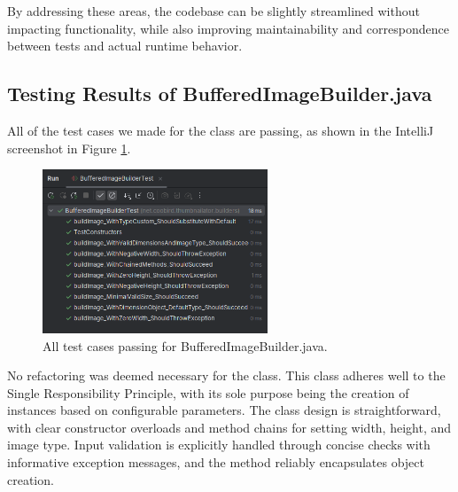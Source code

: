\documentclass[12pt]{article}
\begin{document}
    

    By addressing these areas, the codebase can be slightly streamlined without impacting functionality, while also improving maintainability and correspondence between tests and actual runtime behavior.

    \markboth{}{}
    \subsection{Testing Results of BufferedImageBuilder.java}
    \markboth{}{}

    All of the test cases we made for the  class
        are passing, as shown in the IntelliJ screenshot in Figure
        \ref{fig:buffered_image_builder_test_results}.
    \begin{figure}[H]
        \centering
        \includegraphics[width=0.6\textwidth]{images/buffered_image_builder_test_results.png}
        \caption[All test cases passing for BufferedImageBuilder.java.]{All test cases passing for BufferedImageBuilder.java.}
        \label{fig:buffered_image_builder_test_results}
    \end{figure}

    No refactoring was deemed necessary for the 
        class.
    This class adheres well to the Single Responsibility Principle, with its
        sole purpose being the creation of  instances based
        on configurable parameters.
    The class design is straightforward, with clear constructor overloads and
        method chains for setting width, height, and image type.
    Input validation is explicitly handled through concise checks with
        informative exception messages, and the  method reliably
        encapsulates object creation.
\end{document}
